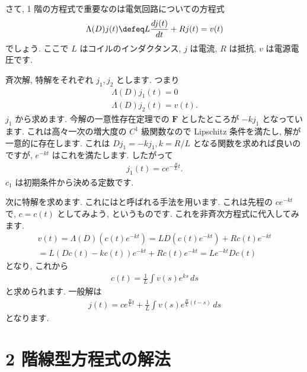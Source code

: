 \documentclass[openany, a4paper, oneside]{jsbook}
\begin{document}
さて, 1 階の方程式で重要なのは電気回路についての方程式
\begin{gather}
\Lambda (D) j (t)
\defeq
L \frac{d j (t)} {dt} + R j (t)
=
v (t)
\end{gather}
でしょう.
ここで $L$ はコイルのインダクタンス,  $j$ は電流,
$R$ は抵抗,  $v$ は電源電圧です.

斉次解, 特解をそれぞれ $j_1,j_2$ とします.
つまり
\begin{gather}
\Lambda (D) j_1 (t) = 0 \\
\Lambda (D) j_2 (t) = v (t) .
\end{gather}
$j_1$ から求めます.
今解の一意性存在定理での $\bm{F}$ としたところが $-k j_1$ となっています.
これは高々一次の増大度の $C^1$ 級関数なので Lipschitz 条件を満たし, 解が一意的に存在します.
これは $D j_1 = - k j_1,k=R/L$ となる関数を求めれば良いのですが,  $e^{-kt}$ はこれを満たします.
したがって
\begin{gather}
j_1 (t)
=
c e^{- \frac{R} {L} t } .
\end{gather}
$c_1$ は初期条件から決める定数です.

次に特解を求めます.
これにはと呼ばれる手法を用います.
これは先程の $ce^{-kt}$ で,  $c=c (t)$ としてみよう, というものです.
これを非斉次方程式に代入してみます.
\begin{gather}
v (t)
=
\Lambda (D) \left ( c (t) e^{-kt} \right)
=
L D \left ( c (t) e^{-kt} \right) + R c (t) e^{-kt} \\
=
L \left ( Dc (t) - k c (t) \right) e^{-kt}  + R c (t) e^{-kt}
=
L e^{-kt} D c (t)
\end{gather}
となり, これから
\begin{gather}
c (t)
=
\frac{1} {L} \int v (s) e^{ks} \, ds
\end{gather}
と求められます.
一般解は
\begin{gather}
j (t)
=
c e^{\frac{R} {L} t} + \frac{1} {L} \int v (s) e^{\frac{R} {L}(t-s)} \, ds
\end{gather}
となります.
\section{2 階線型方程式の解法}
\end{document}
